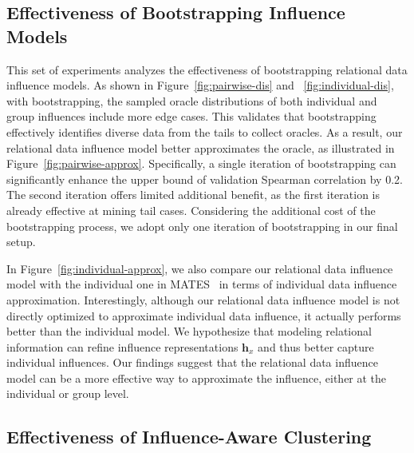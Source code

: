 \subsection{Effectiveness of Bootstrapping Influence Models}
\label{sec:eff-bootstrapping}


This set of experiments analyzes the effectiveness of bootstrapping relational data influence models. As shown in Figure~\ref{fig:pairwise-dis} and ~\ref{fig:individual-dis}, with bootstrapping, the sampled oracle distributions of both individual and group influences include more edge cases. This validates that bootstrapping effectively identifies diverse data from the tails to collect oracles. As a result, our relational data influence model better approximates the oracle, as illustrated in Figure~\ref{fig:pairwise-approx}. Specifically, a single iteration of bootstrapping can significantly enhance the upper bound of validation Spearman correlation by 0.2. 
The second iteration offers limited additional benefit, as the first iteration is already effective at mining tail cases. 
Considering the additional cost of the bootstrapping process, we adopt only one iteration of bootstrapping in our final setup. 


In Figure~\ref{fig:individual-approx}, we also compare our relational data influence model with the individual one in MATES~\cite{yu2024mates} in terms of individual data influence approximation. Interestingly, although our relational data influence model is not directly optimized to approximate individual data influence, it actually performs better than the individual model. We hypothesize that modeling relational information can refine influence representations $\textbf{h}_{x}$ and thus better capture individual influences. Our findings suggest that the relational data influence model can be a more effective way to approximate the influence, either at the individual or group level.

\subsection{Effectiveness of Influence-Aware Clustering}
\label{sec:eff-clustering}

